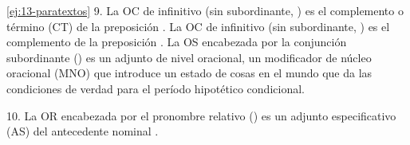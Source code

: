 \begin{solucion}{\ref{ej:13-paratextos}}
9. La OC de infinitivo (sin subordinante, ) es
el complemento o término (CT) de la preposición . La OC de infinitivo
(sin subordinante, ) es el
complemento de la preposición . La OS encabezada por la conjunción
subordinante  ()
es un adjunto de nivel oracional, un modificador de núcleo oracional (MNO) que
introduce un estado de cosas en el mundo que da las condiciones de verdad para
el período hipotético condicional.

10. La OR encabezada por el pronombre relativo  () es un adjunto especificativo (AS) del antecedente nominal
.

\end{solucion}
